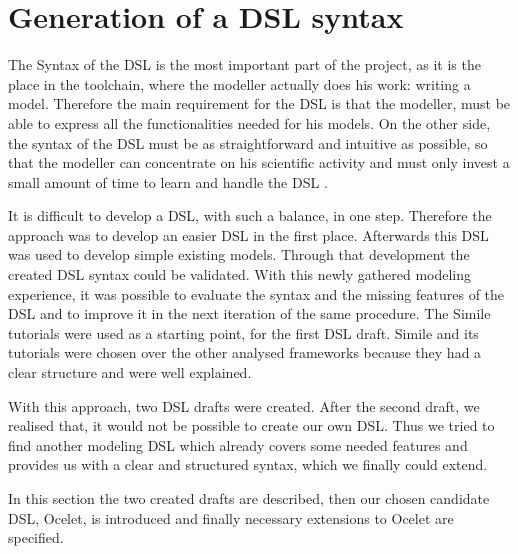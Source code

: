 \chapter{Generation of a DSL syntax} \label{chap:generation_dsl}
\par
The Syntax of the DSL is the most important part of the project, as it is the place in the toolchain, where the modeller actually does his work: writing a model. Therefore the main requirement for the DSL is that the modeller, must be able to express all the functionalities needed for his models. On the other side, the syntax of the DSL must be as straightforward and intuitive as possible, so that the modeller can concentrate on his scientific activity and must only invest a small amount of time to learn and handle the DSL \autocite{dsl:mernik}.
\par
It is difficult to develop a DSL, with such a balance, in one step. Therefore the approach was to develop an easier DSL in the first place. Afterwards this DSL was used to develop simple existing models. Through that development the created DSL syntax could be validated. With this newly gathered modeling experience, it was possible to evaluate the syntax and the missing features of the DSL and to improve it in the next iteration of the same procedure.
The Simile tutorials were used as a starting point, for the first DSL draft. Simile and its tutorials were chosen over the other analysed frameworks because they had a clear structure and were well explained.
\par
With this approach, two DSL drafts were created. After the second draft, we realised that, it would not be possible to create our own DSL. Thus we tried to find another modeling DSL which already covers some needed features and provides us with a clear and structured syntax, which we finally could extend.
\par
In this section the two created drafts are described, then our chosen candidate DSL, Ocelet, is introduced and finally necessary extensions to Ocelet are specified.

